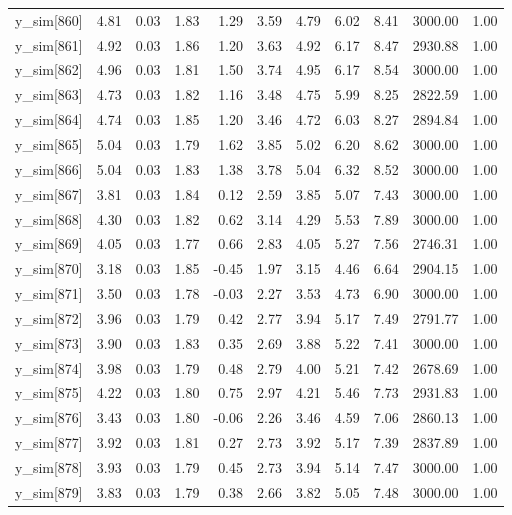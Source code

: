 \begin{table}[ht]
\begin{tabular}{rrrrrrrrrrr}
  y\_sim[860] & 4.81 & 0.03 & 1.83 & 1.29 & 3.59 & 4.79 & 6.02 & 8.41 & 3000.00 & 1.00 \\ 
  y\_sim[861] & 4.92 & 0.03 & 1.86 & 1.20 & 3.63 & 4.92 & 6.17 & 8.47 & 2930.88 & 1.00 \\ 
  y\_sim[862] & 4.96 & 0.03 & 1.81 & 1.50 & 3.74 & 4.95 & 6.17 & 8.54 & 3000.00 & 1.00 \\ 
  y\_sim[863] & 4.73 & 0.03 & 1.82 & 1.16 & 3.48 & 4.75 & 5.99 & 8.25 & 2822.59 & 1.00 \\ 
  y\_sim[864] & 4.74 & 0.03 & 1.85 & 1.20 & 3.46 & 4.72 & 6.03 & 8.27 & 2894.84 & 1.00 \\ 
  y\_sim[865] & 5.04 & 0.03 & 1.79 & 1.62 & 3.85 & 5.02 & 6.20 & 8.62 & 3000.00 & 1.00 \\ 
  y\_sim[866] & 5.04 & 0.03 & 1.83 & 1.38 & 3.78 & 5.04 & 6.32 & 8.52 & 3000.00 & 1.00 \\ 
  y\_sim[867] & 3.81 & 0.03 & 1.84 & 0.12 & 2.59 & 3.85 & 5.07 & 7.43 & 3000.00 & 1.00 \\ 
  y\_sim[868] & 4.30 & 0.03 & 1.82 & 0.62 & 3.14 & 4.29 & 5.53 & 7.89 & 3000.00 & 1.00 \\ 
  y\_sim[869] & 4.05 & 0.03 & 1.77 & 0.66 & 2.83 & 4.05 & 5.27 & 7.56 & 2746.31 & 1.00 \\ 
  y\_sim[870] & 3.18 & 0.03 & 1.85 & -0.45 & 1.97 & 3.15 & 4.46 & 6.64 & 2904.15 & 1.00 \\ 
  y\_sim[871] & 3.50 & 0.03 & 1.78 & -0.03 & 2.27 & 3.53 & 4.73 & 6.90 & 3000.00 & 1.00 \\ 
  y\_sim[872] & 3.96 & 0.03 & 1.79 & 0.42 & 2.77 & 3.94 & 5.17 & 7.49 & 2791.77 & 1.00 \\ 
  y\_sim[873] & 3.90 & 0.03 & 1.83 & 0.35 & 2.69 & 3.88 & 5.22 & 7.41 & 3000.00 & 1.00 \\ 
  y\_sim[874] & 3.98 & 0.03 & 1.79 & 0.48 & 2.79 & 4.00 & 5.21 & 7.42 & 2678.69 & 1.00 \\ 
  y\_sim[875] & 4.22 & 0.03 & 1.80 & 0.75 & 2.97 & 4.21 & 5.46 & 7.73 & 2931.83 & 1.00 \\ 
  y\_sim[876] & 3.43 & 0.03 & 1.80 & -0.06 & 2.26 & 3.46 & 4.59 & 7.06 & 2860.13 & 1.00 \\ 
  y\_sim[877] & 3.92 & 0.03 & 1.81 & 0.27 & 2.73 & 3.92 & 5.17 & 7.39 & 2837.89 & 1.00 \\ 
  y\_sim[878] & 3.93 & 0.03 & 1.79 & 0.45 & 2.73 & 3.94 & 5.14 & 7.47 & 3000.00 & 1.00 \\ 
  y\_sim[879] & 3.83 & 0.03 & 1.79 & 0.38 & 2.66 & 3.82 & 5.05 & 7.48 & 3000.00 & 1.00 \\ 

\end{tabular}
\end{table}
